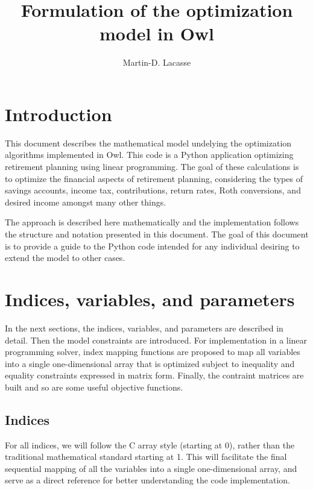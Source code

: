 \documentclass{report}[fleqn,12pt]
\begin{document}
\title{Formulation of the optimization model in Owl}
\author{Martin-D. Lacasse}
\maketitle
\thispagestyle{fancy}
\fancyhead{}

\chapter{Introduction}
This document describes the mathematical model undelying
the optimization algorithms implemented in
Owl. This code is a Python application optimizing retirement
planning using linear programming. The goal of
these calculations is to optimize the financial aspects
of retirement planning, considering the types of savings accounts,
income tax, contributions, return rates, Roth conversions,
and desired income amongst many other things.

The approach is described here mathematically and the implementation
follows the structure and notation presented in this document.
The goal of this document is to provide a guide to the Python code
intended for any individual desiring to extend the model to other cases.

\chapter{Indices, variables, and parameters}
In the next sections, the indices, variables, and parameters are
described in detail. Then the model constraints are introduced.
For implementation in a linear programming solver, index mapping
functions are proposed to map all variables into a single
one-dimensional array that
is optimized subject to inequality and equality constraints
expressed in matrix form. Finally, the contraint matrices are built
and so are some useful objective functions.

\section{Indices}
For all indices, we will follow the C array style (starting at 0),
rather than the traditional mathematical standard starting at 1.
This will facilitate the final
sequential mapping of all the variables into a single one-dimensional array,
and serve as a direct reference for better understanding the code implementation.
\end{document}
